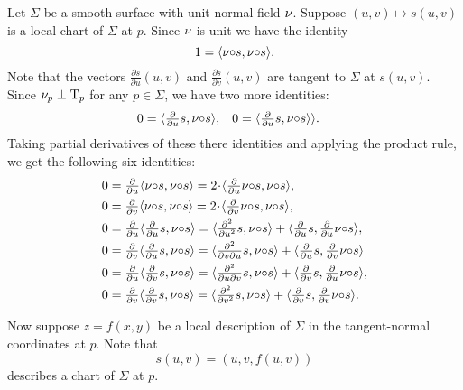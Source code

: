 Let $\Sigma$ be a smooth surface with unit normal field $\nu$.
Suppose $(u,v)\mapsto s(u,v)$ is a local chart of $\Sigma$ at $p$.
Since $\nu$ is unit we have the identity
\[1=\langle\nu{\circ} s,\nu{\circ} s\rangle.\]
Note that the vectors $\tfrac{\partial s}{\partial u}(u,v)$ and $\tfrac{\partial s}{\partial v}(u,v)$ are tangent to $\Sigma$ at $s(u,v)$.
Since $\nu_p\perp\mathrm{T}_p$ for any $p\in\Sigma$, we have two more identities:
\begin{align*}
 0&=\langle\tfrac{\partial}{\partial u} s,\nu{\circ} s\rangle,
 &
 0&=\langle\tfrac{\partial}{\partial u} s,\nu{\circ} s\rangle\rangle.
\end{align*}
Taking partial derivatives of these there identities and applying the product rule,
we get the following six identities:
\begin{align*}
0&=\tfrac{\partial}{\partial u}\langle\Norm{\circ} s,\Norm{\circ} s\rangle
=
2\cdot \langle\tfrac{\partial}{\partial u}\Norm{\circ} s,\Norm{\circ} s\rangle,
\\
0&=\tfrac{\partial}{\partial v}\langle\Norm{\circ} s,\Norm{\circ} s\rangle=2\cdot \langle\tfrac{\partial}{\partial v}\Norm{\circ} s,\Norm{\circ} s\rangle,
\\
0&=\tfrac{\partial}{\partial u}\langle\tfrac{\partial}{\partial u} s,\Norm{\circ} s\rangle=\langle\tfrac{\partial^2}{\partial u^2} s,\Norm{\circ} s\rangle+\langle\tfrac{\partial}{\partial u} s,\tfrac{\partial}{\partial u}\Norm{\circ} s\rangle,
\\
0&=\tfrac{\partial}{\partial v}\langle\tfrac{\partial}{\partial u} s,\Norm{\circ} s\rangle=\langle\tfrac{\partial^2}{\partial v\partial u} s,\Norm{\circ} s\rangle+\langle\tfrac{\partial}{\partial u} s,\tfrac{\partial}{\partial v}\Norm{\circ} s\rangle
\\
0&=\tfrac{\partial}{\partial u}\langle\tfrac{\partial}{\partial v} s,\Norm{\circ} s\rangle=\langle\tfrac{\partial^2}{\partial u\partial v} s,\Norm{\circ} s\rangle+\langle\tfrac{\partial}{\partial v} s,\tfrac{\partial}{\partial u}\Norm{\circ} s\rangle,
\\
0&=\tfrac{\partial}{\partial v}\langle\tfrac{\partial}{\partial v} s,\Norm{\circ} s\rangle=\langle\tfrac{\partial^2}{\partial v^2} s,\Norm{\circ} s\rangle
+
\langle\tfrac{\partial}{\partial v} s,\tfrac{\partial}{\partial v}\Norm{\circ} s\rangle.
\end{align*}

Now suppose $z=f(x,y)$ be a local description of $\Sigma$ in the tangent-normal coordinates at $p$.
Note that 
\[s(u,v)=(u,v,f(u,v))\]
describes a chart of $\Sigma$ at $p$.

